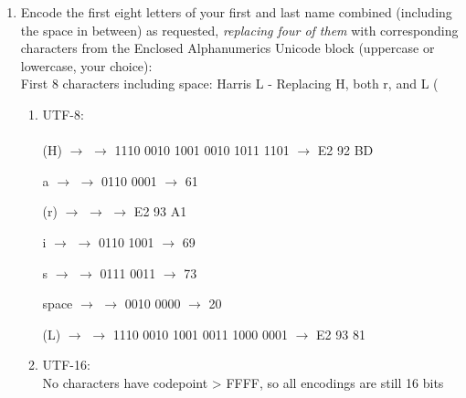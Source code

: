 \documentclass[11pt]{article}
\begin{document}
\begin{enumerate}
\begin{enumerate}

\end{enumerate}

\item Encode the first eight letters of your first and last name combined (including the space
in between) as requested, \emph{replacing four of them} with corresponding characters from the
Enclosed Alphanumerics Unicode block (uppercase or lowercase, your choice):\\

First 8 characters including space: Harris L - Replacing H, both r, and L (

\begin{enumerate}
\item UTF-8:\\

\\

(H) $\rightarrow$  $\rightarrow$ 1110 0010 1001 0010 1011 1101 $\rightarrow$ E2 92 BD

a $\rightarrow$  $\rightarrow$ 0110 0001 $\rightarrow$ 61

(r) $\rightarrow$  $\rightarrow$  $\rightarrow$ E2 93 A1

i $\rightarrow$  $\rightarrow$ 0110 1001 $\rightarrow$ 69

s $\rightarrow$  $\rightarrow$ 0111 0011 $\rightarrow$ 73

space $\rightarrow$  $\rightarrow$ 0010 0000 $\rightarrow$ 20

(L) $\rightarrow$  $\rightarrow$ 1110 0010 1001 0011 1000 0001 $\rightarrow$ E2 93 81\\


\item UTF-16:\\

No characters have codepoint > FFFF, so all encodings are still 16 bits\\

\\



\end{enumerate}
\end{enumerate}
\end{document}
